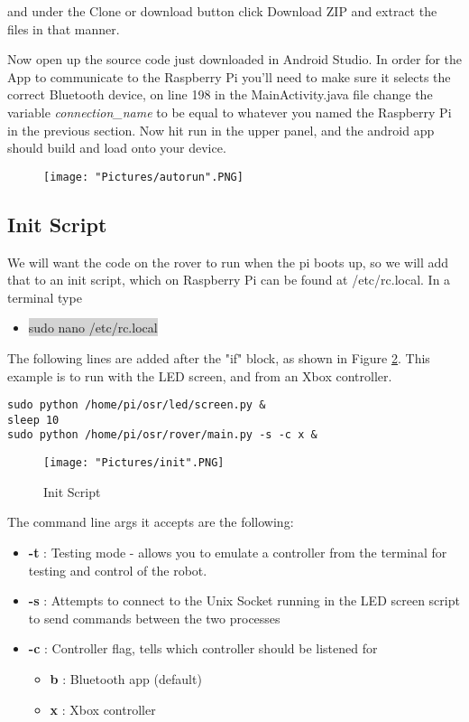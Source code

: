 \documentclass[12pt]{article}
\begin{document}
\noindent and under the Clone or download button click Download ZIP and extract the files in that manner. 

\bigskip

\noindent Now open up the source code just downloaded in Android Studio. In order for the App to communicate to the Raspberry Pi you'll need to make sure it selects the correct Bluetooth device, on line 198 in the MainActivity.java file change the variable \textit{connection\_name} to be equal to whatever you named the Raspberry Pi in the previous section. Now hit run in the upper panel, and the android app should build and load onto your device. 

\begin{figure}[H]
 	\centering
	\texttt{[image: "Pictures/autorun".PNG]}
 	\caption{}
	\label{}
\end{figure}


\subsection{Init Script}
We will want the code on the rover to run when the pi boots up, so we will add that to an init script, which on Raspberry Pi can be found at /etc/rc.local. In a terminal type
\begin{itemize}
	\item[] \colorbox{lightgray}{sudo nano /etc/rc.local}
\end{itemize}
\noindent The following lines are added after the "if" block, as shown in Figure \ref{init}. This example is to run with the LED screen, and from an Xbox controller.

\begin{verbatim}
sudo python /home/pi/osr/led/screen.py &
sleep 10
sudo python /home/pi/osr/rover/main.py -s -c x &
\end{verbatim}

\begin{figure}[H]
 	\centering
	\texttt{[image: "Pictures/init".PNG]}
 	\caption{Init Script}
	\label{init}
\end{figure}

The command line args it accepts are the following:

\begin{itemize}
	\item[] \textbf{-t} : Testing mode - allows you to emulate a controller from the terminal for testing and control of the robot. 
	\item[] \textbf{-s} : Attempts to connect to the Unix Socket running in the LED screen script to send commands between the two processes
	\item[] \textbf{-c} : Controller flag, tells which controller should be listened for
	\begin{itemize}
		\item [] \textbf{b} : Bluetooth app (default)
		\item [] \textbf{x} : Xbox controller
	\end{itemize} 	

\end{itemize}
\end{document}
